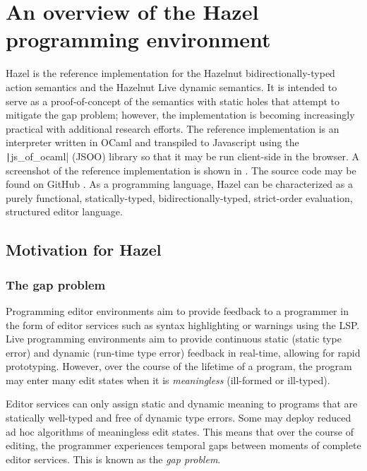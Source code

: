 \chapter{An overview of the Hazel programming environment}
\label{sec:hazel}

Hazel is the reference implementation for the Hazelnut bidirectionally-typed action semantics and the Hazelnut Live dynamic semantics. It is intended to serve as a proof-of-concept of the semantics with static holes that attempt to mitigate the gap problem; however, the implementation is becoming increasingly practical with additional research efforts. The reference implementation is an interpreter written in OCaml and transpiled to Javascript using the \texttt|js_of_ocaml| (JSOO) library \cite{vouillon2014bytecode} so that it may be run client-side in the browser. A screenshot of the reference implementation is shown in  \cite{HazelDemo2022}. The source code may be found on GitHub \cite{Hazel2022}. As a programming language, Hazel can be characterized as a purely functional, statically-typed, bidirectionally-typed, strict-order evaluation, structured editor language.

\section{Motivation for Hazel}
\label{sec:hazel-motivation}

\subsection{The gap problem}
\label{sec:gap-problem}


Programming editor environments aim to provide feedback to a programmer in the form of editor services such as syntax highlighting or warnings using the LSP. Live programming environments aim to provide continuous static (static type error) and dynamic (run-time type error) feedback in real-time, allowing for rapid prototyping. However, over the course of the lifetime of a program, the program may enter many edit states when it is \textit{meaningless} (ill-formed or ill-typed).

Editor services can only assign static and dynamic meaning to programs that are statically well-typed and free of dynamic type errors. Some may deploy reduced ad hoc algorithms of meaningless edit states. This means that over the course of editing, the programmer experiences temporal gaps between moments of complete editor services. This is known as the \textit{gap problem}.

